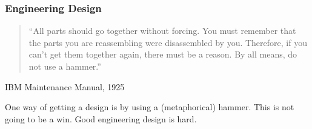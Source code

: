 \begin{frame}
\frametitle{Engineering Design}

\begin{quote}
``All parts should go together without forcing.  You must remember that the parts you are reassembling were disassembled by you.  Therefore, if you can't get them together again, there must be a reason.  By all means, do not use a hammer.''
\end{quote}
\hfill IBM Maintenance Manual, 1925\\[1em]

\begin{changemargin}{1.4cm}
One way of getting a design is by using a (metaphorical) hammer. This is
not going to be a win. Good engineering design is hard.
\end{changemargin}

\end{frame}

